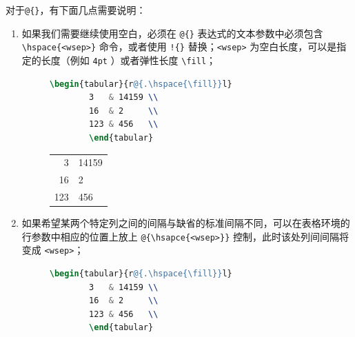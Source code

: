 \begin{enumerate}
    对于\verb|@{}|，有下面几点需要说明：
    \begin{enumerate}
        \item 如果我们需要继续使用空白，必须在 \verb|@{}| 表达式的文本参数中必须包含 \verb|\hspace{<wsep>}| 命令，或者使用 \verb|!{}| 替换；\verb|<wsep>| 为空白长度，可以是指定的长度（例如 \verb|4pt| ）或者弹性长度 \verb|\fill|；
        \begin{figure}[!hpbt]
        \begin{minipage}{0.5\textwidth}
        \begin{lstlisting}[language=tex]
        \begin{tabular}{r@{.\hspace{\fill}}l}
        3   & 14159 \\
        16  & 2     \\
        123 & 456   \\
        \end{tabular}
        \end{lstlisting}%
        \end{minipage}
        \begin{minipage}{0.45\textwidth}
        \centering
        \begin{tabular}{r@{.\hspace{\fill}}l}
        3   & 14159 \\
        16  & 2     \\
        123 & 456   \\
        \end{tabular}
        \end{minipage}
        \end{figure}
        \item 如果希望某两个特定列之间的间隔与缺省的标准间隔不同，可以在表格环境的行参数中相应的位置上放上 \verb|@{\hsapce{<wsep>}}| 控制，此时该处列间间隔将变成 \verb|<wsep>|；
        \begin{figure}[!hpbt]
        \begin{minipage}{0.5\textwidth}
        \begin{lstlisting}[language=tex]
        \begin{tabular}{r@{.\hspace{\fill}}l}
        3   & 14159 \\
        16  & 2     \\
        123 & 456   \\
        \end{tabular}
        \end{lstlisting}%

\end{minipage}
\end{figure}
\end{enumerate}
\end{enumerate}
